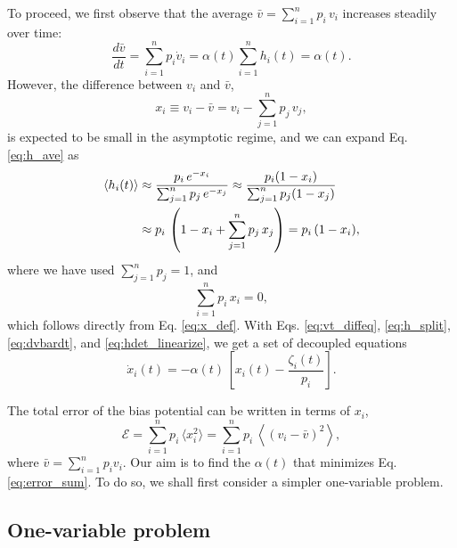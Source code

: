 \documentclass[reprint]{revtex4-1}
\begin{document}
To proceed, we first observe that
the average $\bar v = \sum_{i = 1}^n p_i \, v_i$
increases steadily over time:
%
\begin{equation}
\frac{ d \bar v } { d t }
=
\sum_{i = 1}^n p_i \dot v_i
=
\alpha(t) \sum_{i = 1}^n h_i(t) = \alpha(t).
\label{eq:dvbardt}
\end{equation}
%
However, the difference between $v_i$ and $\bar v$,
%
\begin{equation}
  x_i \equiv v_i - \bar v = v_i - \sum_{j = 1}^n p_j \, v_j,
  \label{eq:x_def}
\end{equation}
%
is expected to be small in the asymptotic regime,
and we can expand Eq. \eqref{eq:h_ave} as
\begin{align}
\langle h_i(t) \rangle
&\approx
\frac{ p_i \, e^{- x_i} }
{ \sum_{ j = 1}^n p_j \, e^{- x_j} }
\approx
\frac{ p_i ( 1 - x_i ) }
{ \sum_{ j = 1}^n p_j (1 - x_j) }
\notag \\
&\approx
p_i \, \left(
  1 - x_i + \sum_{j=1}^n p_j \, x_j
\right)
=
p_i \, (1 - x_i),
\label{eq:hdet_linearize}
\end{align}
where we have used $\sum_{j=1}^n p_j = 1$,
and
%
\begin{equation}
  \sum_{i = 1}^n p_i \, x_i = 0,
  \label{eq:px_sum}
\end{equation}
which follows directly from Eq. \eqref{eq:x_def}.
%
With Eqs.
\eqref{eq:vt_diffeq},
\eqref{eq:h_split},
\eqref{eq:dvbardt},
and
\eqref{eq:hdet_linearize},
we get a set of decoupled equations
%
\begin{equation}
  \dot x_i(t)
  =
  -\alpha(t) \, \left[ x_i(t) - \frac{ \zeta_i(t) } { p_i } \right].
  \label{eq:dxdt_WL}
\end{equation}



The total error of the bias potential can be written in
terms of $x_i$,
\begin{equation}
\mathcal E
=
\sum_{i = 1}^n p_i \, \langle x_i^2 \rangle
=
\sum_{i = 1}^n p_i \, \left\langle (v_i - \bar v)^2 \right\rangle,
\label{eq:error_sum}
\end{equation}
where
$\bar v = \sum_{i = 1}^n p_i v_i$.
%
Our aim is to find the $\alpha(t)$
that minimizes Eq. \eqref{eq:error_sum}.
%
To do so, we shall first consider
a simpler one-variable problem.



\subsection{One-variable problem}
\end{document}
